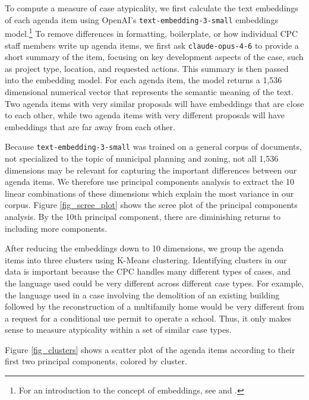 To compute a measure of case atypicality, we first calculate the text embeddings of each agenda item using OpenAI's \texttt{text-embedding-3-small} embeddings model.\footnote{For an introduction to the concept of embeddings, see \citet{mikolov2013} and \citet{le2014}.} To remove differences in formatting, boilerplate, or how individual CPC staff members write up agenda items, we first ask \texttt{claude-opus-4-6} to provide a short summary of the item, focusing on key development aspects of the case, such as project type, location, and requested actions. This summary is then passed into the embedding model. For each agenda item, the model returns a 1,536 dimensional numerical vector that represents the semantic meaning of the text. Two agenda items with very similar proposals will have embeddings that are close to each other, while two agenda items with very different proposals will have embeddings that are far away from each other. 

Because \texttt{text-embedding-3-small} was trained on a general corpus of documents, not specialized to the topic of municipal planning and zoning, not all 1,536 dimensions may be relevant for capturing the important differences between our agenda items. We therefore use principal components analysis to extract the 10 linear combinations of these dimensions which explain the most variance in our corpus. Figure \ref{fig_scree_plot} shows the scree plot of the principal components analysis. By the 10th principal component, there are diminishing returns to including more components.

After reducing the embeddings down to 10 dimensions, we group the agenda items into three clusters using K-Means clustering. Identifying clusters in our data is important because the CPC handles many different types of cases, and the language used could be very different across different case types. For example, the language used in a case involving the demolition of an existing building followed by the reconstruction of a multifamily home would be very different from a request for a conditional use permit to operate a school. Thus, it only makes sense to measure atypicality within a set of similar case types.

Figure \ref{fig_clusters} shows a scatter plot of the agenda items according to their first two principal components, colored by cluster. 


